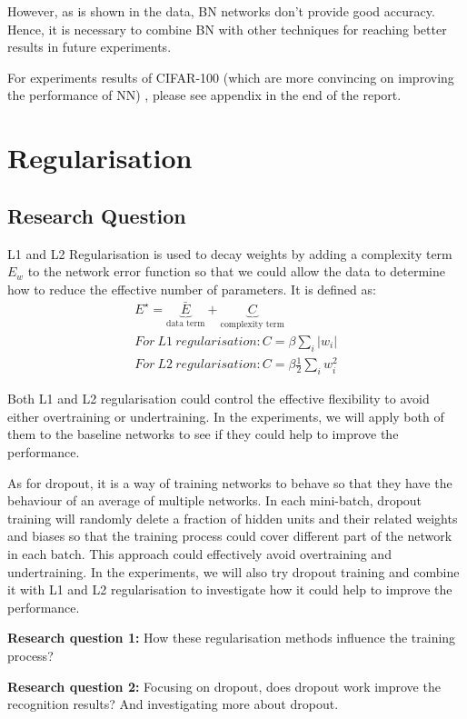 \documentclass[]{article}
\begin{document}
However, as is shown in the data, BN networks don't provide good accuracy. Hence, it is necessary to combine BN with other techniques for reaching better results in future experiments.

For experiments results of CIFAR-100 (which are more convincing on improving the performance of NN) , please see appendix in the end of the report.

\section{Regularisation}
\subsection{Research Question}
L1 and L2 Regularisation is used to decay weights by adding a complexity term $E_w$ to the network error function so that we could allow the data to determine how to reduce the effective number of parameters. It is defined as:
\begin{eqnarray*}
   E^\star =  \underbrace{\bar{E}}_{\textrm{data term}} + \underbrace{C}_{\textrm{complexity term}} \\
   For \ L1 \ regularisation: C = \beta \sum_{i} \left | w_i \right | \\
   For \ L2 \ regularisation: C = \beta \frac{1}{2}\sum_{i} w_i^2 
\end{eqnarray*}

Both L1 and L2 regularisation could control the effective flexibility to avoid either overtraining or undertraining. In the experiments, we will apply both of them to the baseline networks to see if they could help to improve the performance. 

As for dropout, it is a way of training networks to behave so that they have the behaviour of an average of multiple networks. In each mini-batch, dropout training will randomly delete a fraction of hidden units and their related weights and biases so that the training process could cover different part of the network in each batch. This approach could effectively avoid overtraining and undertraining. In the experiments, we will also try dropout training and combine it with L1 and L2 regularisation to investigate how it could help to improve the performance.

\textbf{Research question 1:} How these regularisation methods influence the training process?

\textbf{Research question 2:} Focusing on dropout, does dropout work improve the recognition results? And investigating more about dropout.
\end{document}
